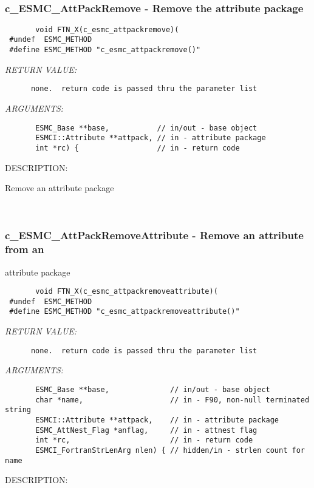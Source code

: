  
\mbox{}\hrulefill\ 
 
\subsubsection [c\_ESMC\_AttPackRemove] {c\_ESMC\_AttPackRemove - Remove the attribute package}


  
\begin{verbatim}       void FTN_X(c_esmc_attpackremove)(
 #undef  ESMC_METHOD
 #define ESMC_METHOD "c_esmc_attpackremove()"\end{verbatim}{\em RETURN VALUE:}
\begin{verbatim}      none.  return code is passed thru the parameter list
   \end{verbatim}{\em ARGUMENTS:}
\begin{verbatim}       ESMC_Base **base,           // in/out - base object
       ESMCI::Attribute **attpack, // in - attribute package
       int *rc) {                  // in - return code
   \end{verbatim}
{\sf DESCRIPTION:\\ }


      Remove an attribute package
   
 
\mbox{}\hrulefill\ 
 
\subsubsection [c\_ESMC\_AttPackRemoveAttribute] {c\_ESMC\_AttPackRemoveAttribute - Remove an attribute from an}


                                                attribute package
  
\begin{verbatim}       void FTN_X(c_esmc_attpackremoveattribute)(
 #undef  ESMC_METHOD
 #define ESMC_METHOD "c_esmc_attpackremoveattribute()"\end{verbatim}{\em RETURN VALUE:}
\begin{verbatim}      none.  return code is passed thru the parameter list
   \end{verbatim}{\em ARGUMENTS:}
\begin{verbatim}       ESMC_Base **base,              // in/out - base object
       char *name,                    // in - F90, non-null terminated string
       ESMCI::Attribute **attpack,    // in - attribute package
       ESMC_AttNest_Flag *anflag,     // in - attnest flag
       int *rc,                       // in - return code
       ESMCI_FortranStrLenArg nlen) { // hidden/in - strlen count for name
   \end{verbatim}
{\sf DESCRIPTION:\\ }


